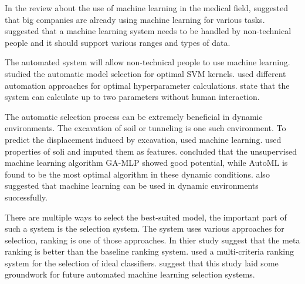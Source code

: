 In the review about the use of machine learning in the medical field, \cite*{ref_paper_33} suggested that big companies are already using machine learning for various tasks. \citeauthor{ref_paper_33} suggested that a machine learning system needs to be handled by non-technical people and it should support various ranges and types of data.

The automated system will allow non-technical people to use machine learning. \cite*{ref_paper_3} studied the automatic model selection for optimal SVM kernels. \citeauthor{ref_paper_3} used different automation approaches for optimal hyperparameter calculations. \citeauthor{ref_paper_3} state that the system can calculate up to two parameters without human interaction.

The automatic selection process can be extremely beneficial in dynamic environments. The excavation of soil or tunneling is one such environment. To predict the displacement induced by excavation, \cite*{ref_paper_1} used machine learning. \citeauthor{ref_paper_1} used properties of soli and imputed them as features. \citeauthor{ref_paper_1} concluded that the unsupervised machine learning algorithm GA-MLP showed good potential, while AutoML is found to be the most optimal algorithm in these dynamic conditions. \cite*{ref_paper_13} also suggested that machine learning can be used in dynamic environments successfully.

There are multiple ways to select the best-suited model, the important part of such a system is the selection system. The system uses various approaches for selection, ranking is one of those approaches. In thier study \cite*{ref_paper_23} suggest that the meta ranking is better than the baseline ranking system. \citeauthor{ref_paper_23} used a multi-criteria ranking system for the selection of ideal classifiers. \citeauthor{ref_paper_23} suggest that this study laid some groundwork for future automated machine learning selection systems.
